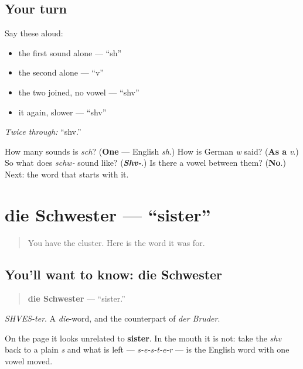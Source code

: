 \subsection*{Your turn}
Say these aloud:

\begin{itemize}
\raggedright
  \item the first sound alone — \textquotedblleft{}sh\textquotedblright{}
  \item the second alone — \textquotedblleft{}v\textquotedblright{}
  \item the two joined, no vowel — \textquotedblleft{}shv\textquotedblright{}
  \item it again, slower — \textquotedblleft{}shv\textquotedblright{}
\end{itemize}

\emph{Twice through:} \textquotedblleft{}shv.\textquotedblright{}

\begin{tcolorbox}[breakable,colback=teal!4,colframe=teal!35!black,title={Before you move on}]
How many sounds is \emph{sch}? (\textbf{One} — English \emph{sh}.) How is German \emph{w} said? (\textbf{As a} \emph{v}.) So what does \emph{schw-} sound like? (\emph{\textbf{Shv-}}.) Is there a vowel between them? (\textbf{No}.) Next: the word that starts with it.
\end{tcolorbox}
\section[die Schwester]{die Schwester — \textquotedblleft{}sister\textquotedblright{}}

\label{lesson:GE-C10-schwester}



\begin{quote}
You have the cluster. Here is the word it was for.
\end{quote}

\subsection*{You'll want to know: die Schwester}
\begin{quote}
\textbf{die Schwester} — \textquotedblleft{}sister.\textquotedblright{}
\end{quote}

\emph{SHVES-ter}. A \emph{die}-word, and the counterpart of \emph{der Bruder}.

On the page it looks unrelated to \textbf{sister}. In the mouth it is not: take the \emph{shv} back to a plain \emph{s} and what is left — \emph{s-e-s-t-e-r} — is the English word with one vowel moved.

